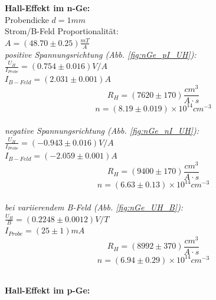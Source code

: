 \documentclass[12pt,a4paper]{article}
\begin{document}
\begin{multicols}{2}

\noindent \textbf{Hall-Effekt im n-Ge:}\\
Probendicke $d=1mm$\\
Strom/B-Feld Proportionalität:\\
$A=(48.70 \pm 0.25)\frac{mT}{A}$\\

\noindent \emph{positive Spannungsrichtung (Abb. \ref{fig:nGe_pI_UH}):}\\

\noindent$\frac{U_H}{I_{Probe}}=(0.754\pm 0.016)V/A$\\
$I_{B-Feld}=(2.031 \pm 0.001)A$\\
$$R_H=(7620 \pm 170)\frac{cm^3}{A\cdot s}$$
$$n=(8.19\pm 0.019)\times 10^{14}cm^{-3}$$\\


\noindent \emph{negative Spannungsrichtung (Abb. \ref{fig:nGe_nI_UH}):}\\

\noindent$\frac{U_H}{I_{Probe}}=(-0.943\pm 0.016)V/A$\\
$I_{B-Feld}=(-2.059 \pm 0.001)A$\\
$$R_H=(9400 \pm 170)\frac{cm^3}{A\cdot s}$$
$$n=(6.63\pm 0.13)\times 10^{14}cm^{-3}$$\\


\noindent \emph{bei variierendem B-Feld (Abb. \ref{fig:nGe_UH_B}):}\\

\noindent$\frac{U_H}{B}=(0.2248\pm 0.0012)V/T$\\
$I_{Probe}=(25 \pm 1)mA$\\
$$R_H=(8992 \pm 370)\frac{cm^3}{A\cdot s}$$
$$n=(6.94\pm 0.29)\times 10^{14}cm^{-3}$$\\




\pagebreak
\end{multicols}
\noindent \textbf{Hall-Effekt im p-Ge:}\\


\end{document}

